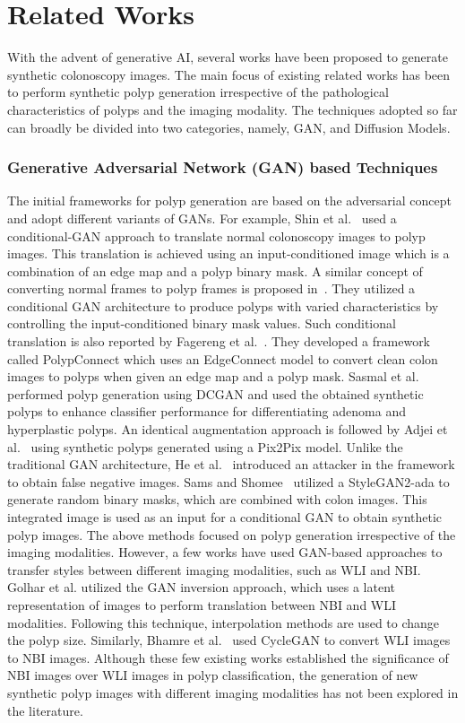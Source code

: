 \section{Related Works}
With the advent of generative AI, several works have been proposed to generate synthetic colonoscopy images. The main focus of existing related works has been to perform synthetic polyp generation irrespective of the pathological characteristics of polyps and the imaging modality. The techniques adopted so far can broadly be divided into two categories, namely, GAN, and Diffusion Models.  

\subsubsection*{Generative Adversarial Network (GAN) based Techniques}
The initial frameworks for polyp generation are based on the adversarial concept and adopt different variants of GANs. For example, Shin et al.~\cite{shin2018abnormal} used a conditional-GAN approach to translate normal colonoscopy images to polyp images. This translation is achieved using an input-conditioned image which is a combination of an edge map and a polyp binary mask. A similar concept of converting normal frames to polyp frames is proposed in~\cite{qadir2022simple}. They utilized a conditional GAN architecture to produce polyps with varied characteristics by controlling the input-conditioned binary mask values. Such conditional translation is also reported by Fagereng et al.~\cite{fagereng2022polypconnect}. They developed a framework called PolypConnect which uses an EdgeConnect model to convert clean colon images to polyps when given an edge map and a polyp mask. Sasmal et al.~\cite{sasmal2020improved} performed polyp generation using DCGAN and used the obtained synthetic polyps to enhance classifier performance for differentiating adenoma and hyperplastic polyps. An identical augmentation approach is followed by Adjei et al.~\cite{adjei2022examining} using synthetic polyps generated using a Pix2Pix model. Unlike the traditional GAN architecture, He et al.~\cite{he2021colonoscopic} introduced an attacker in the framework to obtain false negative images. Sams and Shomee~\cite{sams2022gan} utilized a StyleGAN2-ada to generate random binary masks, which are combined with colon images. This integrated image is used as an input for a conditional GAN to obtain synthetic polyp images. The above methods focused on polyp generation irrespective of the imaging modalities. However, a few works have used GAN-based approaches to transfer styles between different imaging modalities, such as WLI and NBI. Golhar et al. \cite{golhar2022gan} utilized the GAN inversion approach, which uses a latent representation of images to perform translation between NBI and WLI modalities. Following this technique, interpolation methods are used to change the polyp size. Similarly, Bhamre et al.~\cite{bhamre2022colonoscopy} used CycleGAN to convert WLI images to NBI images. Although these few existing works established the significance of NBI images over WLI images in polyp classification, the generation of new synthetic polyp images with different imaging modalities has not been explored in the literature.      


